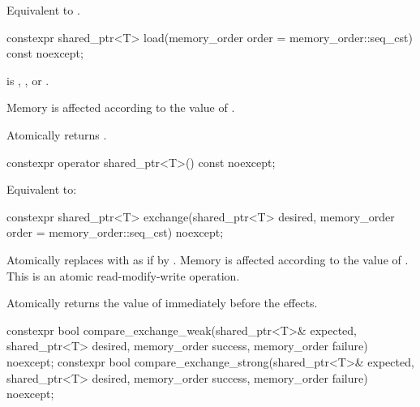 \begin{itemdescr}
\pnum
\effects
Equivalent to .
\end{itemdescr}

%
\begin{itemdecl}
constexpr shared_ptr<T> load(memory_order order = memory_order::seq_cst) const noexcept;
\end{itemdecl}

\begin{itemdescr}
\pnum
\expects
{} is
,
, or
.

\pnum
\effects
Memory is affected according to the value of .

\pnum
\returns
Atomically returns .
\end{itemdescr}

%
\begin{itemdecl}
constexpr operator shared_ptr<T>() const noexcept;
\end{itemdecl}

\begin{itemdescr}
\pnum
\effects
Equivalent to: 
\end{itemdescr}

%
\begin{itemdecl}
constexpr shared_ptr<T> exchange(shared_ptr<T> desired,
                                 memory_order order = memory_order::seq_cst) noexcept;
\end{itemdecl}

\begin{itemdescr}
\pnum
\effects
Atomically replaces  with 
as if by .
Memory is affected according to the value of .
This is an atomic read-modify-write operation.

\pnum
\returns
Atomically returns the value of  immediately before the effects.
\end{itemdescr}

%
%
\begin{itemdecl}
constexpr bool compare_exchange_weak(shared_ptr<T>& expected, shared_ptr<T> desired,
                                     memory_order success, memory_order failure) noexcept;
constexpr bool compare_exchange_strong(shared_ptr<T>& expected, shared_ptr<T> desired,
                                       memory_order success, memory_order failure) noexcept;
\end{itemdecl}

